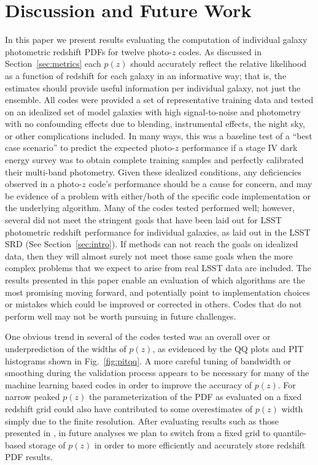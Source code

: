 \section{Discussion and Future Work}
\label{sec:discussion}

In this paper we present results evaluating the computation of individual galaxy photometric redshift PDFs for twelve photo-$z$ codes.
As discussed in Section~\ref{sec:metrics} each $p(z)$ should accurately reflect the relative likelihood as a function of redshift for each galaxy in an informative way; that is, the estimates should provide useful information per individual galaxy, not just the ensemble.
All codes were provided a set of representative training data and tested on an idealized set of model galaxies with high signal-to-noise and photometry with no confounding effects due to blending, instrumental effects, the night sky, or other complications included.  %
In many ways, this was a baseline test of a ``best case scenario'' to predict the expected photo-$z$ performance if a stage IV dark energy survey was to obtain complete training samples and perfectly calibrated their multi-band photometry.
Given these idealized conditions, any deficiencies observed in a photo-$z$ code's performance should be a cause for concern, and may be evidence of a problem with either/both of the specific code implementation or the underlying algorithm.
Many of the codes tested performed well; however, several did not meet the stringent goals that have been laid out for LSST photometric redshift performance for individual galaxies, as laid out in the LSST SRD (See Section~\ref{sec:intro}).%
If methods can not reach the goals on idealized data, then they will almost surely not meet those same goals when the more complex problems that we expect to arise from real LSST data are included.
The results presented in this paper enable an evaluation of which algorithms are the most promising moving forward, and potentially point to implementation choices or mistakes which could be improved or corrected in others.
Codes that do not perform well may not be worth pursuing in future challenges.

One obvious trend in several of the codes tested was an overall over or underprediction of the widths of $p(z)$, as evidenced by the QQ plots and PIT histograms shown in Fig.~\ref{fig:pitqq}.
A more careful tuning of bandwidth or smoothing during the validation process appears to be necessary for many of the machine learning based codes in order to improve the accuracy of $p(z)$.
For narrow peaked $p(z)$ the parameterization of the PDF as evaluated on a fixed redshift grid could also have contributed to some overestimates of $p(z)$ width simply due to the finite resolution.
After evaluating results such as those presented in \citet[]{Malz:qp}, in future analyses we plan to switch from a fixed grid to quantile-based storage of $p(z)$ in order to more efficiently and accurately store redshift PDF results.

